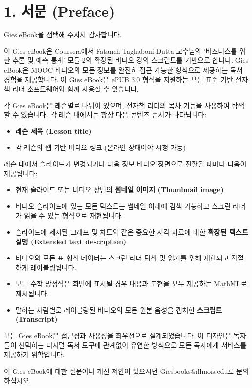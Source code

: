 \documentclass[11pt,a4paper]{article}
\begin{document}
\newpage
\section*{1. 서문 (Preface)}

Gies eBook을 선택해 주셔서 감사합니다.

이 Gies eBook은 Coursera에서 Fataneh Taghaboni-Dutta 교수님의 '비즈니스를 위한 추론 및 예측 통계' 모듈 2의 확장된 비디오 강의 스크립트를 기반으로 합니다. Gies eBook은 MOOC 비디오의 모든 정보를 완전히 접근 가능한 형식으로 제공하는 독서 경험을 제공합니다. 이 Gies eBook은 ePUB 3.0 형식을 지원하는 모든 표준 기반 전자책 리더 소프트웨어와 함께 사용할 수 있습니다.

각 Gies eBook은 레슨별로 나뉘어 있으며, 전자책 리더의 목차 기능을 사용하여 탐색할 수 있습니다. 각 레슨 내에서는 항상 다음 콘텐츠 순서가 나타납니다:
\begin{itemize}
    \item \textbf{레슨 제목 (Lesson title)}
    \item 각 레슨의 웹 기반 비디오 링크 (온라인 상태여야 시청 가능)
\end{itemize}
레슨 내에서 슬라이드가 변경되거나 다음 정보 비디오 장면으로 전환될 때마다 다음이 제공됩니다:
\begin{itemize}
    \item 현재 슬라이드 또는 비디오 장면의 \textbf{썸네일 이미지 (Thumbnail image)}
    \item 비디오 슬라이드에 있는 모든 텍스트는 썸네일 아래에 검색 가능하고 스크린 리더가 읽을 수 있는 형식으로 재현됩니다.
    \item 슬라이드에 제시된 그래프 및 차트와 같은 중요한 시각 자료에 대한 \textbf{확장된 텍스트 설명 (Extended text description)}
    \item 비디오의 모든 표 형식 데이터는 스크린 리더 탐색 및 읽기를 위해 재현되고 적절하게 레이블링됩니다.
    \item 모든 수학 방정식은 화면에 표시될 경우 내용과 표현을 모두 제공하는 MathML로 제시됩니다.
    \item 말하는 사람별로 레이블링된 비디오의 모든 원본 음성을 캡처한 \textbf{스크립트 (Transcript)}
\end{itemize}
모든 Gies eBook은 접근성과 사용성을 최우선으로 설계되었습니다. 이 디자인은 독자들이 선택하는 디지털 독서 도구에 관계없이 유연한 방식으로 모든 독자에게 서비스를 제공하기 위함입니다.

이 Gies eBook에 대한 질문이나 개선 제안이 있으시면 Giesbooks@illinois.edu로 문의하십시오.
\end{document}
